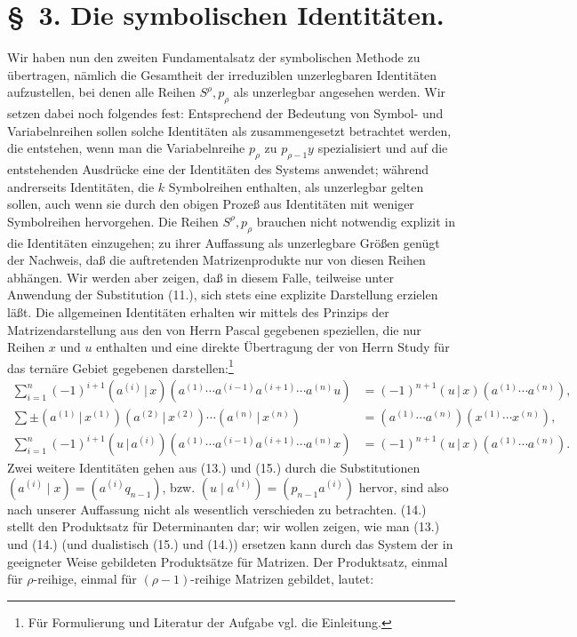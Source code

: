 \documentclass[11pt]{article}
\providecommand{\pair}[2]{(#1\,|\,#2)}
\begin{document}
\section*{\S\ 3. Die symbolischen Identitäten.}
Wir haben nun den zweiten Fundamentalsatz der symbolischen Methode zu übertragen, nämlich die Gesamtheit der irreduziblen unzerlegbaren Identitäten aufzustellen, bei denen alle Reihen $S^\rho,p_\rho$ als unzerlegbar angesehen werden. Wir setzen dabei noch folgendes fest: Entsprechend der Bedeutung von Symbol- und Variabelnreihen sollen solche Identitäten als zusammengesetzt betrachtet werden, die entstehen, wenn man die Variabelnreihe $p_\rho$ zu $p_{\rho-1}y$ spezialisiert und auf die entstehenden Ausdrücke eine der Identitäten des Systems anwendet; während andrerseits Identitäten, die $k$ Symbolreihen enthalten, als unzerlegbar gelten sollen, auch wenn sie durch den obigen Prozeß aus Identitäten mit weniger Symbolreihen hervorgehen. Die Reihen $S^\rho,p_\rho$ brauchen nicht notwendig explizit in die Identitäten einzugehen; zu ihrer Auffassung als unzerlegbare Größen genügt der Nachweis, daß die auftretenden Matrizenprodukte nur von diesen Reihen abhängen. Wir werden aber zeigen, daß in diesem Falle, teilweise unter Anwendung der Substitution (11.), sich stets eine explizite Darstellung erzielen läßt. Die allgemeinen Identitäten erhalten wir mittels des Prinzips der Matrizendarstellung aus den von Herrn Pascal gegebenen speziellen, die nur Reihen $x$ und $u$ enthalten und eine direkte Übertragung der von Herrn Study für das ternäre Gebiet gegebenen darstellen:\footnote{Für Formulierung und Literatur der Aufgabe vgl. die Einleitung.}
\begin{align}
\sum_{i=1}^n(-1)^{i+1}\pair{a^{(i)}}{x}(a^{(1)}\cdots a^{(i-1)}a^{(i+1)}\cdots a^{(n)}u)&=(-1)^{n+1}\pair{u}{x}(a^{(1)}\cdots a^{(n)}),\tag{13}\\
\sum\pm\pair{a^{(1)}}{x^{(1)}}\pair{a^{(2)}}{x^{(2)}}\cdots\pair{a^{(n)}}{x^{(n)}}&=(a^{(1)}\cdots a^{(n)})(x^{(1)}\cdots x^{(n)}),\tag{14}\\
\sum_{i=1}^n(-1)^{i+1}\pair{u}{a^{(i)}}(a^{(1)}\cdots a^{(i-1)}a^{(i+1)}\cdots a^{(n)}x)&=(-1)^{n+1}\pair{u}{x}(a^{(1)}\cdots a^{(n)}).\tag{15}
\end{align}
Zwei weitere Identitäten gehen aus (13.) und (15.) durch die Substitutionen $(a^{(i)}\mid x)=(a^{(i)}q_{n-1})$, bzw. $(u\mid a^{(i)})=(p_{n-1}a^{(i)})$ hervor, sind also nach unserer Auffassung nicht als wesentlich verschieden zu betrachten. (14.) stellt den Produktsatz für Determinanten dar; wir wollen zeigen, wie man (13.) und (14.) (und dualistisch (15.) und (14.)) ersetzen kann durch das System der in geeigneter Weise gebildeten Produktsätze für Matrizen. Der Produktsatz, einmal für $\rho$-reihige, einmal für $(\rho-1)$-reihige Matrizen gebildet, lautet:
\end{document}
